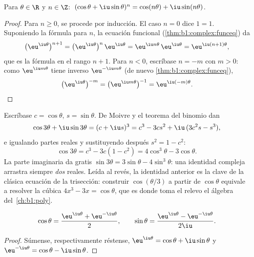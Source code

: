 \begin{corollary}\label{cor:b1:complex:demoivre}
Para $\theta \in \R$ y $n \in \Z$:
$\;(\cos\theta + \iu\sin\theta)^n = \cos(n\theta) +
\iu\sin(n\theta)$.
\end{corollary}

\begin{proof}
Para $n \geq 0$, se procede por inducción. El caso $n = 0$ dice
$1 = 1$. Suponiendo la fórmula para $n$, la ecuación funcional
(\cref{thm:b1:complex:funceq}) da
\[
\bigl(\eu^{\iu\theta}\bigr)^{n+1}
= \bigl(\eu^{\iu\theta}\bigr)^{n}\,\eu^{\iu\theta}
= \eu^{\iu n\theta}\,\eu^{\iu\theta}
= \eu^{\iu(n+1)\theta} ,
\]
que es la fórmula en el rango $n + 1$. Para $n < 0$, escríbase $n = -m$
con $m > 0$: como $\eu^{\iu m\theta}$ tiene inverso
$\eu^{-\iu m\theta}$ (de nuevo \cref{thm:b1:complex:funceq}),
\[
\bigl(\eu^{\iu\theta}\bigr)^{-m}
= \bigl(\eu^{\iu m\theta}\bigr)^{-1}
= \eu^{\iu(-m)\theta} . \qedhere
\]
\end{proof}

\begin{example}\label{ex:b1:complex:cos3}
Escríbase $c = \cos\theta$, $s = \sin\theta$. De Moivre y el teorema
del binomio dan
\[
\cos 3\theta + \iu \sin 3\theta = (c + \iu s)^3
= c^3 - 3cs^2 + \iu\,(3c^2 s - s^3),
\]
e igualando partes reales y sustituyendo después $s^2 = 1 - c^2$:
\[
\cos 3\theta = c^3 - 3c(1 - c^2) = 4\cos^3\theta - 3\cos\theta .
\]
La parte imaginaria da gratis $\sin 3\theta = 3\sin\theta -
4\sin^3\theta$: una identidad compleja arrastra siempre \emph{dos}
reales. Leída al revés, la identidad anterior es la clave de la
clásica ecuación de la trisección: construir $\cos(\theta/3)$ a partir
de $\cos\theta$ equivale a resolver la cúbica $4x^3 - 3x = \cos\theta$,
que es donde toma el relevo el álgebra del~\cref{ch:b1:poly}.
\end{example}

\begin{proposition}\label{prop:b1:complex:euler}
\[
\cos\theta = \frac{\eu^{\iu\theta} + \eu^{-\iu\theta}}{2},
\qquad
\sin\theta = \frac{\eu^{\iu\theta} - \eu^{-\iu\theta}}{2\iu}.
\]
\end{proposition}

\begin{proof}
Súmense, respectivamente réstense, $\eu^{\iu\theta} = \cos\theta +
\iu\sin\theta$ y $\eu^{-\iu\theta} = \cos\theta - \iu\sin\theta$.
\end{proof}

